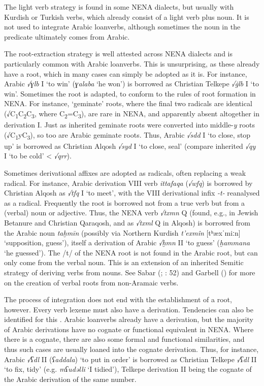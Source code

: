\documentclass[output=paper]{langsci/langscibook}
\begin{document}
The light verb strategy is found in some NENA dialects, but usually with Kurdish or Turkish verbs, which already consist of a light verb plus noun. It is not used to integrate Arabic loanverbs, although sometimes the noun in the predicate ultimately comes from Arabic.

The root-extraction strategy is well attested across NENA dialects and is particularly common with Arabic loanverbs. This is unsurprising, as these already have a root, which in many cases can simply be adopted as it is. For instance, Arabic \textit{√ɣlb} I ‘to win’ (\textit{ɣalaba} ‘he won’) is borrowed as Christian Telkepe \textit{√\.glb} I ‘to win’. Sometimes the root is adapted, to conform to the rules of root formation in NENA. For instance, ‘geminate’ roots, where the final two radicals are identical (√C\textsubscript{1}C\textsubscript{2}C\textsubscript{3}, where C\textsubscript{2}=C\textsubscript{3}), are rare in NENA, and apparently absent altogether in derivation I. Just as inherited geminate roots were converted into middle-\textit{y} roots (√C\textsubscript{1}yC\textsubscript{3}), so too are Arabic geminate roots. Thus, Arabic \textit{√sdd} I ‘to close, stop up’ is borrowed as Christian Alqosh \textit{√syd} I ‘to close, seal’ (compare inherited \textit{√qy{\R}} I ‘to be cold’ < \textit{√qrr}).

Sometimes derivational affixes are adopted as radicals, often replacing a weak radical. For instance, Arabic derivation VIII verb \textit{ittafaqa} (\textit{√wfq}) is borrowed by Christian Alqosh as \textit{√tfq} I ‘to meet’, with the VIII derivational infix \textit{\nobreakdash-t\nobreakdash-} reanalysed as a radical. Frequently the root is borrowed not from a true verb but from a (verbal) noun or adjective. Thus, the NENA verb \textit{√txmn} Q (found, e.g., in Jewish Betanure and Christian Qaraqosh, and as \textit{√txml} Q in Alqosh) is borrowed from the Arabic noun \textit{taḫmīn} (possibly via Northern Kurdish \textit{t’exmîn} [tʰæxˈmiːn] ‘supposition, guess’), itself a derivation of Arabic \textit{√ḫmn} II ‘to guess’ (\textit{ḫammana} ‘he guessed’). The /t/ of the NENA root is not found in the Arabic root, but can only come from the verbal noun. This is an extension of an inherited Semitic strategy of deriving verbs from nouns. See Sabar (\citeyear{Sabar1984}; \citeyear{Sabar2002}: 52) and Garbell (\citeyear[166]{Garbell1965}) for more on the creation of verbal roots from non-Aramaic verbs.

The process of integration does not end with the establishment of a root, however. Every verb lexeme must also have a derivation. Tendencies can also be identified for this \citep{Coghill2015}. Arabic loanverbs already have a derivation, but the majority of Arabic derivations have no cognate or functional equivalent in NENA. Where there is a cognate, there are also some formal and functional similarities, and thus such cases are usually loaned into the cognate derivation. Thus, for instance, Arabic \textit{√ʕdl} II (\textit{ʕaddala}) ‘to put in order’ is borrowed as Christian Telkepe \textit{√ʕdl} II ‘to fix, tidy’ (e.g. \textit{mʕudəlli} ‘I tidied’), Telkepe derivation II being the cognate of the Arabic derivation of the same number.
\end{document}
